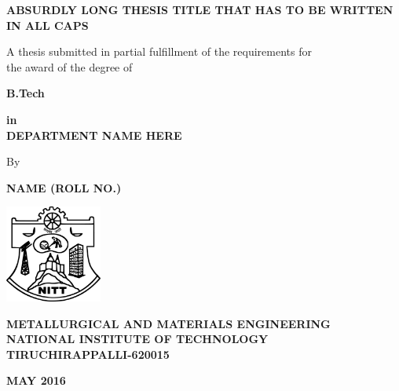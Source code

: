\begin{titlepage}
\begin{center}
\fontsize{18pt}{1cm}\selectfont \textbf{ABSURDLY LONG THESIS TITLE THAT HAS TO BE WRITTEN IN ALL CAPS}

\vspace*{1.4cm}
\fontsize{14pt}{21pt}\selectfont A thesis submitted in partial fulfillment of the requirements for\\
the award of the degree of

\vspace*{0.8cm}
\fontsize{14pt}{1cm}\selectfont\textbf{B.Tech} 

\vspace*{0.8cm}
\textbf{in\\DEPARTMENT NAME HERE}

\vspace*{2.0cm}
By

\textbf{NAME (ROLL NO.)}

\vspace*{3.4cm}
\includegraphics[width=1.25in]{NITT-Logo}

\vspace*{0.3cm}
\fontsize{16pt}{16pt}\selectfont \textbf{METALLURGICAL AND MATERIALS ENGINEERING\\NATIONAL INSTITUTE OF TECHNOLOGY\\TIRUCHIRAPPALLI-620015}

\vspace*{0.5cm}
\textbf{MAY 2016}
\end{center}
\end{titlepage}
